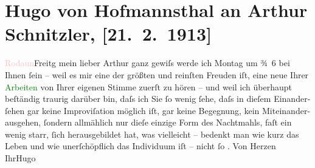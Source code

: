 

               \section[Hugo von Hofmannsthal an Arthur Schnitzler, {[}21. 2. 1913{]}]{ Hugo von Hofmannsthal an Arthur Schnitzler, {[}21. 2. 1913{]}}\nopagebreak{}\rehead{ }\normalsize\beginnumbering{} \toendnotes[C]{\smallbreak\pagebreak[2]} 
\toendnotes[C]{\smallbreak}\pstart
           \raggedleft{}{\pb}\textcolor{pink}{Rodaun}{}\ledrightnote{\textcolor{pink}{Rodaun}}{ }Freitg\pend
           \pstart{}mein lieber Arthur \pend\pstart
           ganz gewiſs werde ich Montag um ¾ 6 bei Ihnen ſein – weil
               es mir eine der größten und reinſten Freuden iſt, eine neue Ihrer \textcolor{green}{Arbeiten}{} von Ihrer eigenen Stimme zuerſt zu
               hören – und weil ich überhaupt beſtändig {\pb}traurig darüber bin, daſs ich Sie
               ſo wenig ſehe, daſs in dieſem Einander-ſehen gar keine Improviſation möglich iſt, gar
               keine Begegnung, kein Miteinander-ausgehen, ſondern allmählich nur dieſe einzige Form
               des Nachtmahls, faſt ein wenig starr, ſich herausgebildet hat, was vielleicht –
               bedenkt man wie kurz das Leben und wie unerſchöpflich das Individuum iſt – nicht ſo
                  \label{T_L02113_1v}\label{T_L02113_1h}.\pend
           \pstart Von Herzen Ihr\spacefill\mbox{Hugo}\pend{}\endnumbering{}  
      